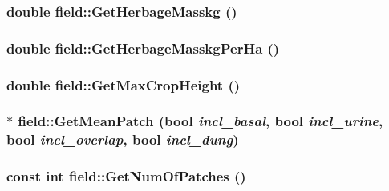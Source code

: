 \label{classfield_aaa75ae81d0511e47197059ee64b38dc5}
\hypertarget{classfield_ad5e1460e730daa874bb7b0fced8ebb5a}{
\subsubsection[{GetHerbageMasskg}]{\setlength{\rightskip}{0pt plus 5cm}double field::GetHerbageMasskg ()}}
\label{classfield_ad5e1460e730daa874bb7b0fced8ebb5a}
\hypertarget{classfield_aedfd65c34ae6b67acbd5cdfb2e5d1a9e}{
\subsubsection[{GetHerbageMasskgPerHa}]{\setlength{\rightskip}{0pt plus 5cm}double field::GetHerbageMasskgPerHa ()}}
\label{classfield_aedfd65c34ae6b67acbd5cdfb2e5d1a9e}
\hypertarget{classfield_a486e5f6dd9eba623677d0442dbf57926}{
\subsubsection[{GetMaxCropHeight}]{\setlength{\rightskip}{0pt plus 5cm}double field::GetMaxCropHeight ()}}
\label{classfield_a486e5f6dd9eba623677d0442dbf57926}
\hypertarget{classfield_a45e0e46b4d636c8f903dd50ca1927b02}{
\subsubsection[{GetMeanPatch}]{ $\ast$ field::GetMeanPatch (bool {\em incl\_\-basal}, \/  bool {\em incl\_\-urine}, \/  bool {\em incl\_\-overlap}, \/  bool {\em incl\_\-dung})}}
\label{classfield_a45e0e46b4d636c8f903dd50ca1927b02}
\hypertarget{classfield_aebe4396575cb69945b1aa60e4837f48c}{
\subsubsection[{GetNumOfPatches}]{\setlength{\rightskip}{0pt plus 5cm}const int field::GetNumOfPatches ()}}
